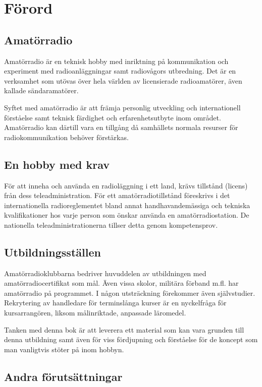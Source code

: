 \chapter*{Förord}
\section*{Amatörradio}
Amatörradio är en teknisk hobby med inriktning på kommunikation och experiment
med radioanläggningar samt radiovågors utbredning. Det är en verksamhet som
utövas över hela världen av licensierade radioamatörer, även kallade
sändaramatörer.

Syftet med amatörradio är att främja personlig utveckling och internationell
förståelse samt teknisk färdighet och erfarenhetsutbyte inom området.
Amatörradio kan därtill vara en tillgång då samhällets normala resurser för
radiokommunikation behöver förstärkas.

\section*{En hobby med krav}

För att inneha och använda en radioläggning i ett land, krävs tillstånd (licens)
från dess teleadministration. För ett amatörradiotillstånd föreskrivs
i det internationella radioreglementet bland annat handhavandemässiga och
tekniska kvalifikationer hos varje person som önskar använda en
amatörradiostation. De nationella teleadministrationerna tillser detta genom
kompetensprov.

\section*{Utbildningsställen}

Amatörradioklubbarna bedriver huvuddelen av utbildningen med
amatörradiocertifikat som mål. Även vissa skolor, militära förband m.fl. har
amatörradio på programmet. I någon utsträckning förekommer även självstudier.
Rekrytering av handledare för terminslånga kurser är en nyckelfråga för
kursarrangören, liksom målinriktade, anpassade läromedel.

Tanken med denna bok är att leverera ett material som kan vara grunden till
denna utbildning samt även för viss fördjupning och förståelse för de koncept
som man vanligtvis stöter på inom hobbyn.

\section*{Andra förutsättningar}


